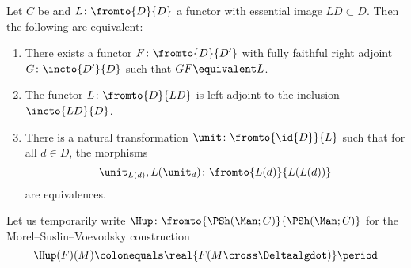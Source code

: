 \begin{proposition}\label{prop:HTT.5.2.7.4}
	Let $ C $ be \acategory and $ L \colon \fromto{D}{D} $ a functor with essential image $ LD \subset D $.
	Then the following are equivalent:
	\begin{enumerate}
		\item\label{prop:HTT.5.2.7.4.1} There exists a functor $ F \colon \fromto{D}{D'} $ with fully faithful right adjoint $ G \colon \incto{D'}{D} $ such that $ GF \equivalent L $.

		\item\label{prop:HTT.5.2.7.4.2} The functor $ L \colon \fromto{D}{LD} $ is left adjoint to the inclusion $ \incto{LD}{D} $.

		\item\label{prop:HTT.5.2.7.4.3} There is a natural transformation $ \unit \colon \fromto{\id{D}}{L} $ such that for all $ d \in D $, the morphisms
		\begin{equation*}
			\unit_{L(d)}, L(\unit_d) \colon \fromto{L(d)}{L(L(d))}
		\end{equation*}
		are equivalences.
	\end{enumerate}
\end{proposition}

\begin{notation}
	Let us temporarily write $ \Hup \colon \fromto{\PSh(\Man;C)}{\PSh(\Man;C)} $ for the Morel--Suslin--Voevodsky construction
	\begin{equation*}
		\Hup(F)(M) \colonequals \real{F(M \cross \Deltaalgdot)} \period
	\end{equation*}
\end{notation}

